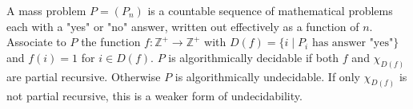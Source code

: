 A mass problem $P = (P_n)$ is a countable sequence of mathematical problems each with a "yes" or "no" answer, written out effectively as a function of $n$. Associate to $P$ the function $f: \mathbb{Z}^+ \to \mathbb{Z}^+$ with $D(f) = \{i \mid P_i \text{ has answer "yes"}\}$ and $f(i) = 1$ for $i \in D(f)$. $P$ is algorithmically decidable if both $f$ and $\chi_{D(f)}$ are partial recursive. Otherwise $P$ is algorithmically undecidable. If only $\chi_{D(f)}$ is not partial recursive, this is a weaker form of undecidability.